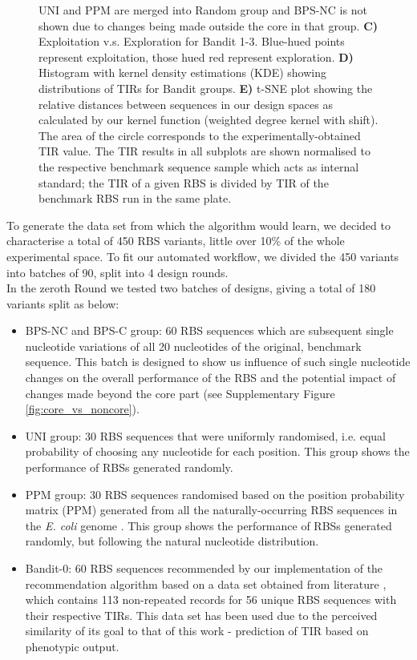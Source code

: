 \documentclass{article}
\newcommand{\mengyan}[1]{\textcolor{magenta}{#1}}
\begin{document}
\begin{figure}[!ht]
{    UNI and PPM are merged into Random group and BPS-NC is not shown due to changes being made outside the core in that group.
    \textbf{C)} Exploitation v.s. Exploration for Bandit 1-3. Blue-hued points represent exploitation, those hued red represent exploration.
    \textbf{D)} Histogram with kernel density estimations (KDE) showing distributions of TIRs for Bandit groups.
    \textbf{E)} t-SNE plot showing the relative distances between sequences in our design spaces as calculated by our kernel function (weighted degree kernel with shift).
    The area of the circle corresponds to the experimentally-obtained TIR value.
    The TIR results in all subplots are shown normalised to the respective benchmark sequence sample which acts as internal standard; the TIR of a given RBS is divided by TIR of the benchmark RBS run in the same plate. }
    \label{fig: Swarmplot and Quantplot}
\end{figure}

To generate the data set from which the algorithm would learn, we decided to characterise a total of 450 RBS variants, little over 10\% of the whole experimental space.
To fit our automated workflow, we divided the 450 variants into batches of 90, split into 4 design rounds.\\

In the zeroth Round we tested two batches of designs, giving a total of 180 variants split as below:

\begin{itemize}
    \item BPS-NC and BPS-C group: 60 RBS sequences which are subsequent single nucleotide variations of all 20 nucleotides of the original, benchmark sequence. This batch is designed to show us influence of such single nucleotide changes on the overall performance of the RBS and the potential impact of changes made beyond the core part (see Supplementary Figure \ref{fig:core_vs_noncore}).
    \item UNI group: 30 RBS sequences that were uniformly randomised, i.e. equal probability of choosing any nucleotide for each position. This group shows the performance of RBSs generated randomly.
    \item PPM group: 30 RBS sequences randomised based on the position probability matrix (PPM) generated from all the naturally-occurring RBS sequences in  the \emph{E. coli} genome \cite{barrick1994quantitative}. This group shows the performance of RBSs generated randomly, but following the natural nucleotide distribution.
    \item Bandit-0: 60 RBS sequences recommended by our implementation of the recommendation algorithm based on a data set obtained from literature \cite{jervis2018machine}, which contains 113 non-repeated records for 56 unique RBS sequences with their respective TIRs.
    This data set has been used due to the perceived similarity of its goal to that of this work - prediction of TIR based on phenotypic output.
\end{itemize}
\end{document}
